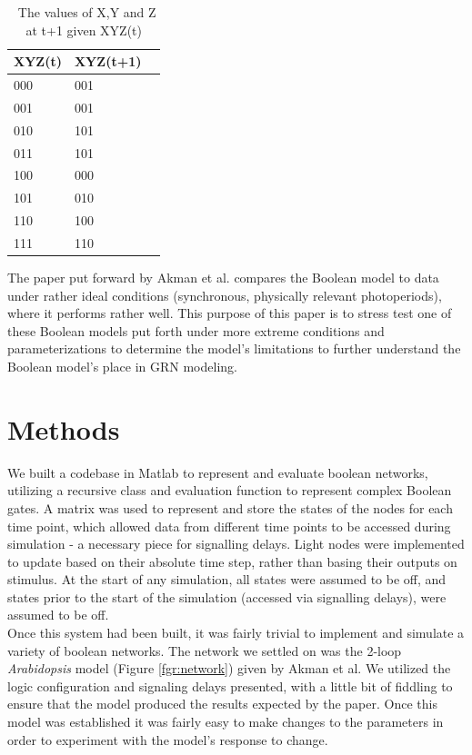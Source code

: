 \documentclass[twoside,twocolumn,9pt]{article}
\begin{document}
\begin{table}[h]
\small
  \caption{\ The values of X,Y and Z at t+1 given XYZ(t)}
  \label{tbl:example}
  \begin{tabular*}{0.5\textwidth}{@{\extracolsep{\fill}}lll}
    \hline
    XYZ(t) & XYZ(t+1) \\
    \hline
    000 & 001 \\
    001 & 001 \\
    010 & 101 \\
    011 & 101 \\
    100 & 000 \\
    101 & 010 \\
    110 & 100 \\
    111 & 110 \\
    \hline
  \end{tabular*}
\end{table}

The paper put forward by Akman et al. compares the Boolean model to data under rather ideal conditions (synchronous, physically relevant photoperiods),  where it performs rather well. This purpose of this paper is to stress test one of these Boolean models put forth under more extreme conditions and parameterizations to determine the model's limitations to further understand the Boolean model's place in GRN modeling.


\section{Methods}

We built a codebase in Matlab to represent and evaluate boolean networks, utilizing a recursive class and evaluation function to represent complex Boolean gates. A matrix was used to represent and store the states of the nodes for each time point, which allowed data from different time points to be accessed during simulation - a necessary piece for signalling delays. Light nodes were implemented to update based on their absolute time step, rather than basing their outputs on stimulus. At the start of any simulation, all states were assumed to be off, and states prior to the start of the simulation (accessed via signalling delays), were assumed to be off. \\
Once this system had been built, it was fairly trivial to implement and simulate a variety of boolean networks. The network we settled on was the 2-loop \textit{Arabidopsis} model (Figure \ref{fgr:network}) given by Akman et al\cite{digiclocks}. We utilized the logic configuration and signaling delays presented, with a little bit of fiddling to ensure that the model produced the results expected by the paper. Once this model was established it was fairly easy to make changes to the parameters in order to experiment with the model's response to change. \\
\end{document}
